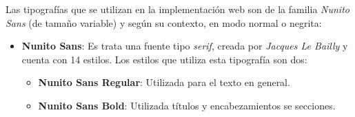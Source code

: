 \documentclass[../ei103948-project-documentation.tex]{subfiles}
\begin{document}
                                Las tipografías que se utilizan en la implementación web son de la familia \textit{Nunito Sans} (de tamaño variable) y según su contexto, en modo normal o negrita:
                                \newpage
                                    \begin{itemize}
                                        \item \textbf{Nunito Sans}: Es trata una fuente tipo \textit{serif}, creada por \textit{Jacques Le Bailly} y cuenta con 14 estilos. Los estilos que utiliza esta tipografía son dos:
                                            \begin{itemize}
                                                \item \textbf{Nunito Sans Regular}: Utilizada para el texto en general.
                                                \begin{figure}[H]
                                                    \begin{center}
                                                    \end{center}
                                                \end{figure}
                        
                                                \item \textbf{Nunito Sans Bold}: Utilizada títulos y encabezamientos se secciones.
                                                \begin{figure}[H]
                                                    \begin{center}
                                                    \end{center}
                                                \end{figure}
                                            \end{itemize}
                                        \end{itemize}
\end{document}
